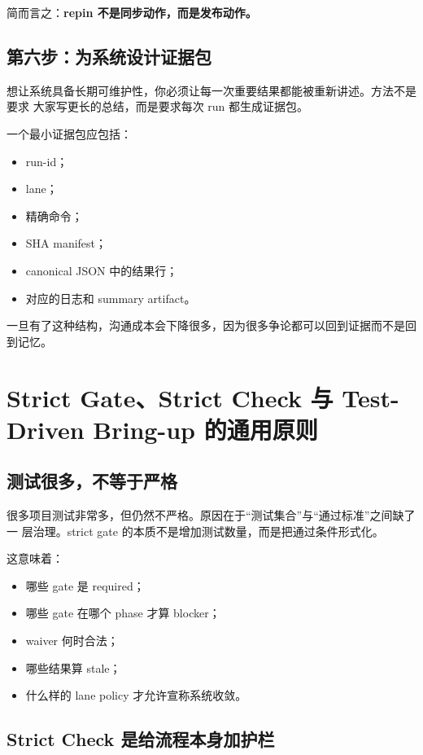 \documentclass[UTF8,11pt,a4paper,oneside]{ctexbook}
\begin{document}
简而言之：\textbf{repin 不是同步动作，而是发布动作。}

\section{第六步：为系统设计证据包}

想让系统具备长期可维护性，你必须让每一次重要结果都能被重新讲述。方法不是要求
大家写更长的总结，而是要求每次 run 都生成证据包。

一个最小证据包应包括：

\begin{itemize}
  \item run-id；
  \item lane；
  \item 精确命令；
  \item SHA manifest；
  \item canonical JSON 中的结果行；
  \item 对应的日志和 summary artifact。
\end{itemize}

一旦有了这种结构，沟通成本会下降很多，因为很多争论都可以回到证据而不是回到记忆。

\chapter{Strict Gate、Strict Check 与 Test-Driven Bring-up 的通用原则}

\section{测试很多，不等于严格}

很多项目测试非常多，但仍然不严格。原因在于“测试集合”与“通过标准”之间缺了一
层治理。strict gate 的本质不是增加测试数量，而是把通过条件形式化。

这意味着：

\begin{itemize}
  \item 哪些 gate 是 required；
  \item 哪些 gate 在哪个 phase 才算 blocker；
  \item waiver 何时合法；
  \item 哪些结果算 stale；
  \item 什么样的 lane policy 才允许宣称系统收敛。
\end{itemize}

\section{Strict Check 是给流程本身加护栏}
\end{document}
